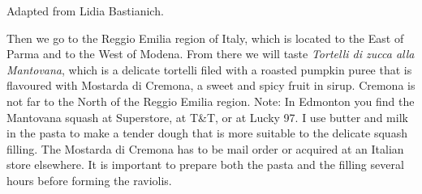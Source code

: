 \documentclass[11pt,letterpaper]{article}
\begin{document}


\begin {flushright}
Adapted from Lidia Bastianich.
\end {flushright}

Then we go to the Reggio Emilia region of Italy, which is located to the East of Parma and to the West of Modena. From there we will taste {\it Tortelli di zucca alla Mantovana}, which is a delicate tortelli filed with a roasted pumpkin puree that is flavoured with Mostarda di Cremona, a sweet and spicy fruit in sirup. Cremona is not far to the North of the Reggio Emilia region. Note:
In Edmonton you find the Mantovana squash at Superstore, at T\&T, or at Lucky 97. I use butter and milk in the pasta to make a tender dough that is more suitable to the delicate squash filling. The Mostarda di Cremona has to be mail order or acquired at an Italian store elsewhere. It is important to prepare both the pasta and the filling several hours before forming the raviolis.
\end{document}
